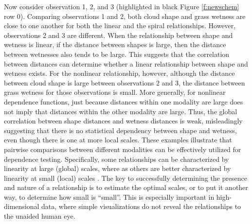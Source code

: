 \documentclass[11pt]{article}
\begin{document}
Now consider observation  1, 2, and 3 (highlighted in black Figure \ref{f:newschem} row 0).  Comparing observations 1 and 2, both cloud shape and grass wetness are close to one another for both the linear  and the  spiral relationships. 
However,  observations 2 and 3 are different.  When the relationship between shape and wetness is linear, if the distance between shapes  is large, then the distance between wetnesses also tends to be large.  This suggests that the correlation between distances can determine whether a linear relationship between shape and wetness exists.  
For the nonlinear relationship, however, although the distance between cloud shape is large between observations 2 and 3, the distance between grass wetness for those observations is small. 
More generally, for nonlinear dependence functions, just because distances within one modality are large does not imply that distances within the other modality are large. 
Thus, the global correlation between shape distances and wetness distances is weak, misleadingly suggesting that there is no statistical dependency between shape and wetness, even though there is one at more local scales.  
These examples illustrate that pairwise comparisons between different modalities can be effectively utilized for dependence testing.
Specifically, some relationships can be characterized by linearity at large (global) scales, where as others are better characterized by linearity at small (local) scales \cite{Allard2012}.
The key to successfully determining the presence and nature of a relationship is to estimate the optimal scales, or to put it another way, to determine how small is ``small''. This is especially important in high-dimensional data, where simple visualizations do not reveal the relationships to the unaided human eye.
\end{document}
